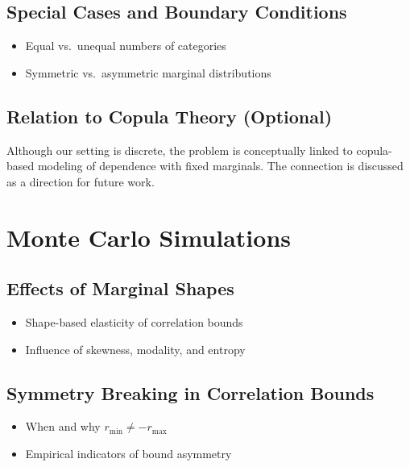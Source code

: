 \documentclass[
  12pt,
]{article}
\providecommand{\tightlist}{%
  \setlength{\itemsep}{0pt}\setlength{\parskip}{0pt}}\usepackage{longtable,booktabs,array}
\theoremstyle{plain}
\theoremstyle{definition}
\theoremstyle{remark}
\begin{document}
\subsection{Special Cases and Boundary
Conditions}\label{special-cases-and-boundary-conditions}

\begin{itemize}
\tightlist
\item
  Equal vs.~unequal numbers of categories\\
\item
  Symmetric vs.~asymmetric marginal distributions
\end{itemize}

\subsection{Relation to Copula Theory
(Optional)}\label{relation-to-copula-theory-optional}

Although our setting is discrete, the problem is conceptually linked to
copula-based modeling of dependence with fixed marginals. The connection
is discussed as a direction for future work.

\section{Monte Carlo Simulations}\label{monte-carlo-simulations}

\subsection{Effects of Marginal
Shapes}\label{effects-of-marginal-shapes}

\begin{itemize}
\tightlist
\item
  Shape-based elasticity of correlation bounds\\
\item
  Influence of skewness, modality, and entropy
\end{itemize}

\subsection{Symmetry Breaking in Correlation
Bounds}\label{symmetry-breaking-in-correlation-bounds}

\begin{itemize}
\tightlist
\item
  When and why \(r_{\min} \neq -r_{\max}\)
\item
  Empirical indicators of bound asymmetry
\end{itemize}
\end{document}
